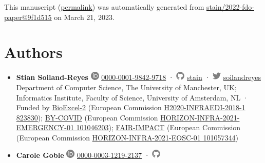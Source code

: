 This manuscript
(\href{https://stain.github.io/2022-fdo-paper/v/9f1d51557301a61b06b5b4dd934b2b478512567f/}{permalink})
was automatically generated
from \href{https://github.com/stain/2022-fdo-paper/tree/9f1d51557301a61b06b5b4dd934b2b478512567f}{stain/2022-fdo-paper@9f1d515}
on March 21, 2023.

\hypertarget{authors}{%
\section*{Authors}\label{authors}}

\begin{itemize}
\item
  \textbf{Stian Soiland-Reyes}
  \includegraphics[width=0.16667in,height=0.16667in]{images/orcid.svg}
  \href{https://orcid.org/0000-0001-9842-9718}{0000-0001-9842-9718}
  · \includegraphics[width=0.16667in,height=0.16667in]{images/github.svg}
  \href{https://github.com/stain}{stain}
  · \includegraphics[width=0.16667in,height=0.16667in]{images/twitter.svg}
  \href{https://twitter.com/soilandreyes}{soilandreyes}
  Department of Computer Science, The University of Manchester, UK; Informatics Institute, Faculty of Science, University of Amsterdam, NL
  · Funded by \href{https://bioexcel.eu/}{BioExcel-2} (European Commission \href{https://cordis.europa.eu/project/id/823830}{H2020-INFRAEDI-2018-1 823830}); \href{https://by-covid.eu/}{BY-COVID} (European Commission \href{https://cordis.europa.eu/project/id/101046203}{HORIZON-INFRA-2021-EMERGENCY-01 101046203}); \href{http://www.fair-impact.eu/}{FAIR-IMPACT} (European Commission (European Commission \href{https://cordis.europa.eu/project/id/101057344}{HORIZON-INFRA-2021-EOSC-01 101057344})
\item
  \textbf{Carole Goble}
  \includegraphics[width=0.16667in,height=0.16667in]{images/orcid.svg}
  \href{https://orcid.org/0000-0003-1219-2137}{0000-0003-1219-2137}
  · \includegraphics[width=0.16667in,height=0.16667in]{images/github.svg}

\end{itemize}
